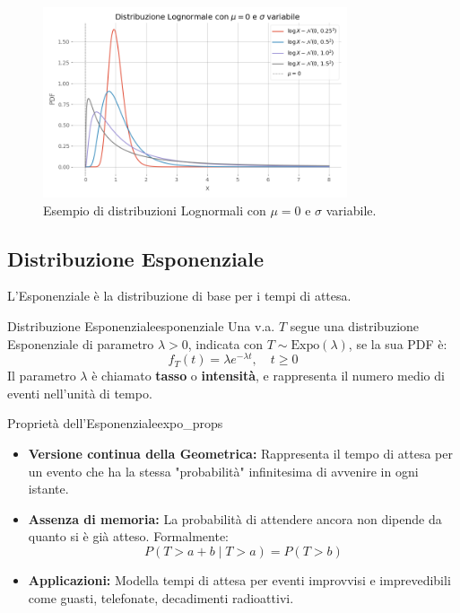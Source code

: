 \begin{figure}[H]
    \centering
    \includegraphics[width=0.8\textwidth]{images/th_01_03/lognormale.png}
    \caption{Esempio di distribuzioni Lognormali con \(\mu=0\) e \(\sigma\) variabile.}
    \label{fig:lognormale}
\end{figure}

\subsection{Distribuzione Esponenziale}
L'Esponenziale è la distribuzione di base per i tempi di attesa.

\begin{definizione}{Distribuzione Esponenziale}{esponenziale}
Una v.a. \(T\) segue una distribuzione Esponenziale di parametro \(\lambda > 0\), indicata con \(T \sim \text{Expo}(\lambda)\), se la sua PDF è:
\[
f_T(t) = \lambda e^{-\lambda t}, \quad t \ge 0
\]
Il parametro \(\lambda\) è chiamato \textbf{tasso} o \textbf{intensità}, e rappresenta il numero medio di eventi nell'unità di tempo.
\end{definizione}

\begin{proposizione}{Proprietà dell'Esponenziale}{expo_props}
\begin{itemize}
    \item \textbf{Versione continua della Geometrica:} Rappresenta il tempo di attesa per un evento che ha la stessa "probabilità" infinitesima di avvenire in ogni istante.
    \item \textbf{Assenza di memoria:} La probabilità di attendere ancora non dipende da quanto si è già atteso. Formalmente:
    \[ P(T > a+b \mid T > a) = P(T > b) \]
    \item \textbf{Applicazioni:} Modella tempi di attesa per eventi improvvisi e imprevedibili come guasti, telefonate, decadimenti radioattivi.
\end{itemize}
\end{proposizione}

